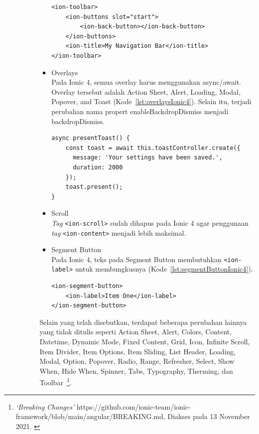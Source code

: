 \begin{enumerate}
\begin{enumerate}
\begin{itemize}
\begin{itemize}
\begin{lstlisting}[label={lst:navbarIonic4}, caption=Penggunaan Navbar pada Ionic 4 dengan {\it Back Button}]
<ion-toolbar>
	<ion-buttons slot="start">
		<ion-back-button></ion-back-button>
	</ion-buttons>
	<ion-title>My Navigation Bar</ion-title>
</ion-toolbar>
\end{lstlisting}
				
				\item Overlays \\
				Pada Ionic 4, semua overlay harus menggunakan async/await. Overlay tersebut adalah Action Sheet, Alert, Loading, Modal, Popover, and Toast (Kode~\ref{lst:overlaysIonic4}). Selain itu, terjadi perubahan nama propert enableBackdropDismiss menjadi backdropDismiss.
				
\begin{lstlisting}[label={lst:overlaysIonic4}, caption=Penggunaan Overlay untuk Toast pada Ionic 4]
async presentToast() {
    const toast = await this.toastController.create({
      message: 'Your settings have been saved.',
      duration: 2000
    });
    toast.present();
}
\end{lstlisting}
				
				\item Scroll \\
				\textit{Tag} \texttt{<ion-scroll>} sudah dihapus pada Ionic 4 agar penggunaan \textit{tag} \texttt{<ion-content>} menjadi lebih maksimal.
				
				\item Segment Button \\
				Pada Ionic 4, teks pada Segment Button membutuhkan \texttt{<ion-label>} untuk membungkusnya (Kode~\ref{lst:segmentButtonIonic4}).
\begin{lstlisting}[label={lst:segmentButtonIonic4}, caption=Penggunaan Segment Button untuk Toast pada Ionic 4]
<ion-segment-button>
	<ion-label>Item One</ion-label>
</ion-segment-button>
\end{lstlisting}
				
			\end{itemize}

			Selain yang telah disebutkan, terdapat beberapa perubahan lainnya yang tidak ditulis seperti Action Sheet, Alert, Colors, Content, Datetime, Dynamic Mode, Fixed Content, Grid, Icon, Infinite Scroll, Item Divider, Item Options, Item Sliding, List Header, Loading, Modal, Option, Popover, Radio, Range, Refresher, Select, Show When, Hide When, Spinner, Tabs, Typography, Therming, dan Toolbar~\footnote{\textit{`Breaking Changes'} https://github.com/ionic-team/ionic-framework/blob/main/angular/BREAKING.md, Diakses pada 13 November 2021. \label{ref:breakingChanges}}.
		\end{itemize}



\end{enumerate}
\end{enumerate}
